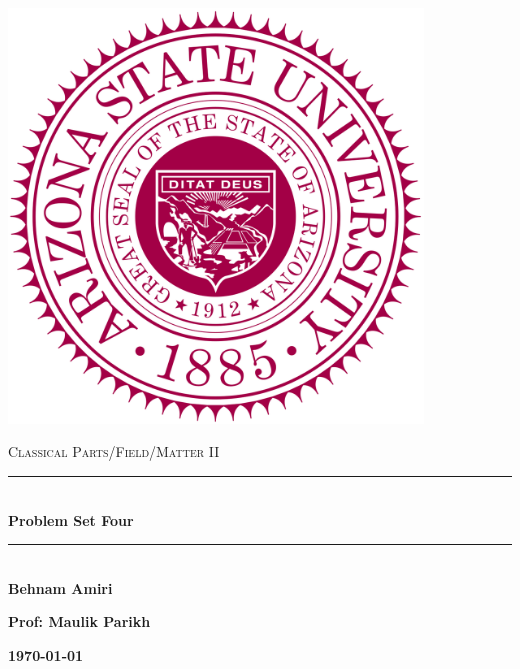 \documentclass[fleqn]{article}
\begin{document}
  \begin{titlepage}

    \newcommand{\HRule}{\rule{\linewidth}{0.5mm}}

    \center

    \begin{center}
      \includegraphics[height=11cm, width=11cm]{asu.png}
    \end{center}

    \vline

    \textsc{\LARGE Classical Parts/Field/Matter II}\\[1.5cm]

    \HRule \\[0.5cm]
    { \huge \bfseries Problem Set Four}\\[0.4cm] 
    \HRule \\[1.0cm]

    \textbf{Behnam Amiri}

    \bigbreak

    \textbf{Prof: Maulik Parikh}

    \bigbreak

    \textbf{{\large \today}\\[2cm]}

    \vfill

  \end{titlepage}
\end{document}

